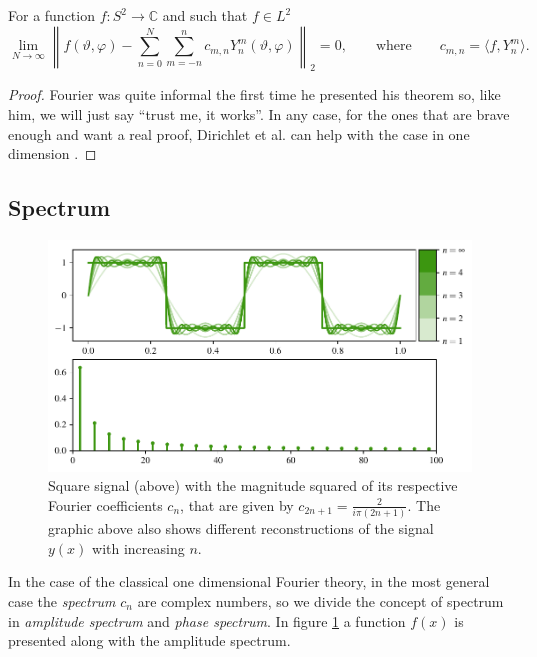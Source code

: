 \begin{theorem}
  \label{kugel:thm:fourier-s2}
  For a function $f: S^2 \to \mathbb{C}$ and such that $f \in L^2$
  \begin{equation*}
    \lim_{N \to \infty}
    \left\|
      f(\vartheta,\varphi)
      - \sum_{n=0}^N\sum_{m=-n}^n c_{m,n} Y^m_n(\vartheta,\varphi)
    \right\|_2 = 0,
    \qquad\text{where}\qquad
    c_{m,n} = \langle f, Y^m_n \rangle.
  \end{equation*}
\end{theorem}
\begin{proof}
  Fourier was quite informal the first time he presented his theorem so, like
  him, we will just say ``trust me, it works''. In any case, for the ones that
  are brave enough and want a real proof, Dirichlet et al. can help with the
  case in one dimension \cite{convergence_fourier}.
\end{proof}

\subsection{Spectrum}
\label{kugel:sec:spectrum}

\begin{figure}
  \centering
  \includegraphics[width=.95\textwidth]{papers/kugel/figures/python/1D-fourier.pdf}
  \caption{
    Square signal (above) with the magnitude squared of its respective Fourier
    coefficients $c_n$, that are given by $c_{2n+1}=\frac{2}{i\pi(2n+1)}$. The
    graphic above also shows different reconstructions of the signal $y(x)$ with
    increasing $n$.
    \label{kugel:fig:1d-fourier}
  }
\end{figure}

 In the case of the classical one dimensional Fourier theory, in the most
 general case the \emph{spectrum} $c_n$ are complex numbers, so we divide the
 concept of spectrum in \emph{amplitude spectrum} and \emph{phase spectrum}. In
 figure \ref{kugel:fig:1d-fourier} a function $f(x)$ is presented along with the
 amplitude spectrum.

